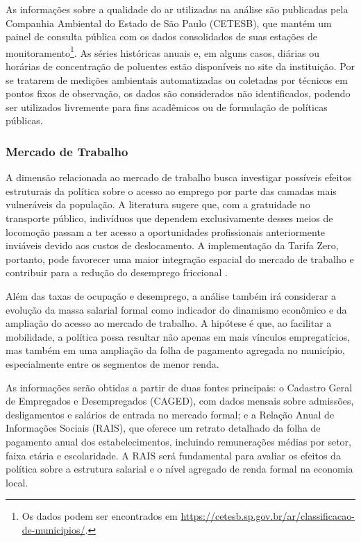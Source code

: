 As informações sobre a qualidade do ar utilizadas na análise são publicadas pela Companhia Ambiental do Estado de São Paulo (CETESB), que mantém um painel de consulta pública com os dados consolidados de suas estações de monitoramento\footnote{Os dados podem ser encontrados em \url{https://cetesb.sp.gov.br/ar/classificacao-de-municipios/}.}. As séries históricas anuais e, em alguns casos, diárias ou horárias de concentração de poluentes estão disponíveis no site da instituição. Por se tratarem de medições ambientais automatizadas ou coletadas por técnicos em pontos fixos de observação, os dados são considerados não identificados, podendo ser utilizados livremente para fins acadêmicos ou de formulação de políticas públicas. 

\subsubsection{Mercado de Trabalho}
A dimensão relacionada ao mercado de trabalho busca investigar possíveis efeitos estruturais da política sobre o acesso ao emprego por parte das camadas mais vulneráveis da população. A literatura sugere que, com a gratuidade no transporte público, indivíduos que dependem exclusivamente desses meios de locomoção passam a ter acesso a oportunidades profissionais anteriormente inviáveis devido aos custos de deslocamento. A implementação da Tarifa Zero, portanto, pode favorecer uma maior integração espacial do mercado de trabalho e contribuir para a redução do desemprego friccional \cite{NO_DAM,BETTER_FIRMS}.

Além das taxas de ocupação e desemprego, a análise também irá considerar a evolução da massa salarial formal como indicador do dinamismo econômico e da ampliação do acesso ao mercado de trabalho. A hipótese é que, ao facilitar a mobilidade, a política possa resultar não apenas em mais vínculos empregatícios, mas também em uma ampliação da folha de pagamento agregada no município, especialmente entre os segmentos de menor renda.

As informações serão obtidas a partir de duas fontes principais: o Cadastro Geral de Empregados e Desempregados (CAGED), com dados mensais sobre admissões, desligamentos e salários de entrada no mercado formal; e a Relação Anual de Informações Sociais (RAIS), que oferece um retrato detalhado da folha de pagamento anual dos estabelecimentos, incluindo remunerações médias por setor, faixa etária e escolaridade. A RAIS será fundamental para avaliar os efeitos da política sobre a estrutura salarial e o nível agregado de renda formal na economia local. 

